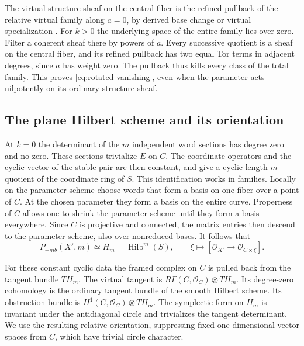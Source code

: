 The virtual structure sheaf on the central fiber is the refined pullback
of the relative virtual family along \(a=0\), by derived base change
or virtual specialization \cite{qu}. For \(k>0\) the underlying space
of the entire family lies over zero. Filter a coherent sheaf there by
powers of \(a\). Every successive quotient is a sheaf on the central
fiber, and its refined pullback has two equal Tor terms in adjacent
degrees, since \(a\) has weight zero. The pullback thus kills every
class of the total family. This proves \eqref{eq:rotated-vanishing},
even when the parameter acts nilpotently on its ordinary structure
sheaf.

\subsection{The plane Hilbert scheme and its orientation}

At \(k=0\) the determinant of the \(m\) independent word sections has
degree zero and no zero. These sections trivialize \(E\) on \(C\).
The coordinate operators and the cyclic vector of the stable pair are
then constant, and give a cyclic length-\(m\) quotient of the coordinate
ring of \(S\). This identification works in families. Locally on the
parameter scheme choose words that form a basis on one fiber over a
point of \(C\). At the chosen parameter they form a basis on the entire
curve. Properness of \(C\) allows one to shrink the parameter scheme
until they form a basis everywhere. Since \(C\) is projective and
connected, the matrix entries then descend to the parameter scheme,
also over nonreduced bases. It follows that
\begin{equation}
 P_{-mb}(X',m)\simeq H_m=\operatorname{Hilb}^m(S),
 \qquad
 \xi\longmapsto [\mathcal O_{X'}\longrightarrow
                          \mathcal O_{C\times\xi}] .
 \label{eq:rotated-hilbert}
\end{equation}

For these constant cyclic data the framed complex on \(C\) is pulled
back from the tangent bundle \(T H_m\). The virtual tangent is
\(R\Gamma(C,\mathcal O_C)\otimes T H_m\). Its degree-zero cohomology is
the ordinary tangent bundle of the smooth Hilbert scheme. Its
obstruction bundle is \(H^1(C,\mathcal O_C)\otimes T H_m\). The
symplectic form on \(H_m\) is invariant under the antidiagonal circle
and trivializes the tangent determinant. We use the resulting relative
orientation, suppressing fixed one-dimensional vector spaces from \(C\),
which have trivial circle character.


